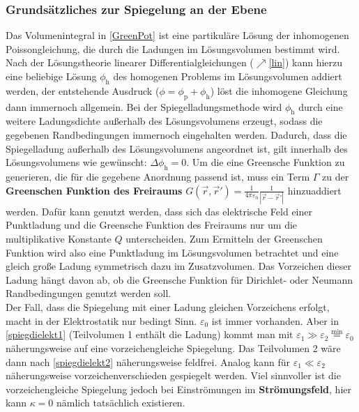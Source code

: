  \subsubsection{Grundsätzliches zur Spiegelung an der Ebene}
		  Das Volumenintegral in \ref{GreenPot} ist eine partikuläre Lösung der inhomogenen Poissongleichung, die durch {die Ladungen im Lösungsvolumen} bestimmt wird. Nach der Lösungstheorie linearer Differentialgleichungen ($\nearrow$\ref{lin}) kann hierzu eine beliebige Lösung $\phi_\text{h}$ des homogenen Problems im Lösungsvolumen addiert werden, der entstehende Ausdruck ($\phi=\phi_\text{p}+\phi_\text{h}$) löst die inhomogene Gleichung dann immernoch allgemein. Bei der Spiegelladungsmethode wird $\phi_\text{h}$ durch eine weitere Ladungsdichte außerhalb des Lösungsvolumens erzeugt, sodass die gegebenen Randbedingungen immernoch eingehalten werden. Dadurch, dass die Spiegelladung außerhalb des Lösungsvolumens angeordnet ist, gilt innerhalb des Lösungsvolumens wie gewünscht: $\Delta \phi_\text{h}=0$. Um die eine Greensche Funktion zu generieren, die für die gegebene Anordnung passend ist, muss ein Term $\Gamma$ zu der \textbf{Greenschen Funktion des Freiraums} $G (\vec{r} ,\vec{r}' ) = \frac{1}{4\pi\varepsilon_0} \frac{1}{|\vec{r} -\vec{r}' |}$ hinzuaddiert werden. Dafür kann genutzt werden, dass sich das elektrische Feld einer Punktladung und die Greensche Funktion des Freiraums nur um die multiplikative Konstante $Q$ unterscheiden. Zum Ermitteln der Greenschen Funktion wird also eine Punktladung im Lösungsvolumen betrachtet und eine gleich große Ladung symmetrisch dazu im Zusatzvolumen. Das Vorzeichen dieser Ladung hängt davon ab, ob die Greensche Funktion für Dirichlet- oder Neumann Randbedingungen genutzt werden soll.\\ Der Fall, dass die Spiegelung mit einer Ladung gleichen Vorzeichens erfolgt, macht in der Elektrostatik nur bedingt Sinn. $\varepsilon_0$ ist immer vorhanden. Aber in \ref{spiegdielekt1} (Teilvolumen 1 enthält die Ladung) kommt man mit $\varepsilon_1\gg\varepsilon_2\stackrel{\text{min}}{=}\varepsilon_{0}$ näherungsweise auf eine vorzeichengleiche Spiegelung. Das Teilvolumen 2 wäre dann nach \ref{spiegdielekt2} näherungsweise feldfrei. Analog kann für $\varepsilon_1\ll\varepsilon_2$ näherungsweise vorzeichenverschieden gespiegelt werden. Viel sinnvoller ist die vorzeichengleiche Spiegelung jedoch bei Einströmungen im \textbf{Strömungsfeld}, hier kann $\kappa=0$ nämlich tatsächlich existieren.\\
